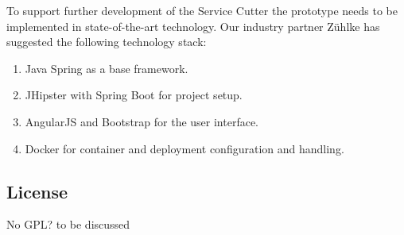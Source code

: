 To support further development of the Service Cutter the prototype needs to be implemented in state-of-the-art technology. Our industry partner Z\"uhlke has suggested the following technology stack:

\begin{enumerate}
	\item Java Spring as a base framework. 
	\item JHipster with Spring Boot for project setup.
	\item AngularJS and Bootstrap for the user interface.
	\item Docker for container and deployment configuration and handling. 
\end{enumerate}

\subsection{License}

No GPL? to be discussed %